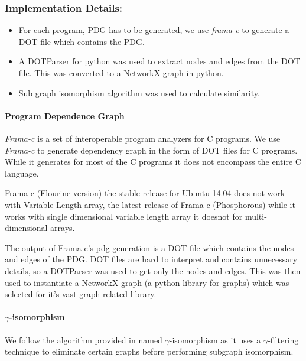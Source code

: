 \subsubsection{Implementation Details:}
    \begin{itemize}
        \item For each program, PDG has to be generated, we use \textit{frama-c} to generate a DOT file which contains the PDG.
        \item A DOTParser for python was used to extract nodes and edges from the DOT file. This was converted to a NetworkX graph in python.
        \item Sub graph isomorphism algorithm was used to calculate similarity.
    \end{itemize}
    
    \paragraph{Program Dependence Graph}
        
        \textit{Frama-c} is a set of interoperable program analyzers for C programs. We use \textit{Frama-c} to generate dependency graph in the form of DOT files for C programs. While it generates for most of the C programs it does not encompass the entire C language. 
        
        Frama-c (Flourine version) the stable release for Ubuntu 14.04 does not work with Variable Length array, the latest release of Frama-c (Phosphorous) while it works with single dimensional variable length array it doesnot for multi-dimensional arrays.
        
        The output of Frama-c's pdg generation is a DOT file which contains the nodes and edges of the PDG. DOT files are hard to interpret and contains unnecessary details, so a DOTParser was used to get only the nodes and edges. This was then used to instantiate a NetworkX graph (a python library for graphs) which was selected for it's vast graph related library.
        
    \paragraph{$\gamma$-isomorphism}
        
        We follow the algorithm provided in \cite{GPLAG} named $\gamma$-isomorphism as it uses a $\gamma$-filtering technique to eliminate certain graphs before performing subgraph isomorphism.
        
